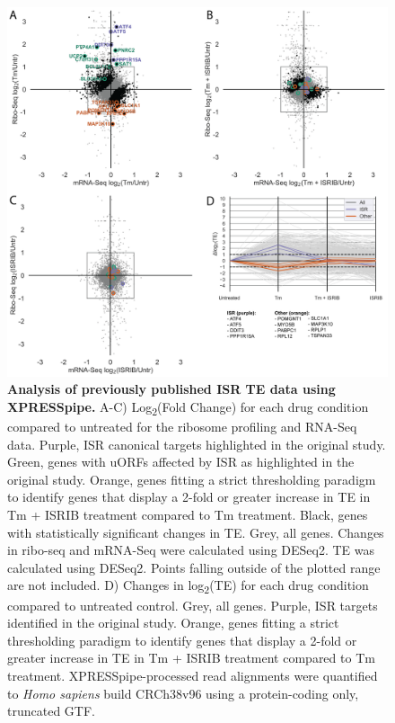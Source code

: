 \documentclass[10pt, oneside]{article}
\begin{document}
\begin{figure}
\centering
  \includegraphics[width=180mm]{figures/xpresspipe_figure3.png}
  \caption{\textbf{Analysis of previously published ISR TE data using XPRESSpipe.} A-C) Log\textsubscript{2}(Fold Change) for each drug condition compared to untreated for the ribosome profiling and RNA-Seq data. Purple, ISR canonical targets highlighted in the original study. Green, genes with uORFs affected by ISR as highlighted in the original study. Orange, genes fitting a strict thresholding paradigm to identify genes that display a 2-fold or greater increase in TE in Tm + ISRIB treatment compared to Tm treatment. Black, genes with statistically significant changes in TE. Grey, all genes. Changes in ribo-seq and mRNA-Seq were calculated using DESeq2. TE was calculated using DESeq2. Points falling outside of the plotted range are not included. D) Changes in log\textsubscript{2}(TE) for each drug condition compared to untreated control. Grey, all genes. Purple, ISR targets identified in the original study. Orange, genes fitting a strict thresholding paradigm to identify genes that display a 2-fold or greater increase in TE in Tm + ISRIB treatment compared to Tm treatment. XPRESSpipe-processed read alignments were quantified to \textit{Homo sapiens} build CRCh38v96 using a protein-coding only, truncated GTF.}
  \label{fig:figure3}
\end{figure}
\end{document}
